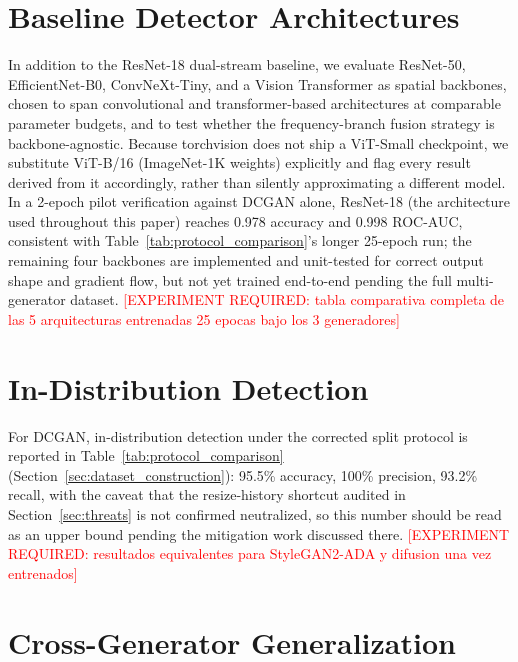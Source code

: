 \documentclass[journal]{IEEEtran}
\newcommand{\pending}[1]{\textcolor{red}{[EXPERIMENT REQUIRED: #1]}}
\begin{document}
\section{Baseline Detector Architectures}
\label{sec:baselines}

In addition to the ResNet-18 dual-stream baseline, we evaluate ResNet-50, EfficientNet-B0, ConvNeXt-Tiny, and a Vision Transformer as spatial backbones, chosen to span convolutional and transformer-based architectures at comparable parameter budgets, and to test whether the frequency-branch fusion strategy is backbone-agnostic. Because torchvision does not ship a ViT-Small checkpoint, we substitute ViT-B/16 (ImageNet-1K weights) explicitly and flag every result derived from it accordingly, rather than silently approximating a different model. In a 2-epoch pilot verification against DCGAN alone, ResNet-18 (the architecture used throughout this paper) reaches 0.978 accuracy and 0.998 ROC-AUC, consistent with Table~\ref{tab:protocol_comparison}'s longer 25-epoch run; the remaining four backbones are implemented and unit-tested for correct output shape and gradient flow, but not yet trained end-to-end pending the full multi-generator dataset. \pending{tabla comparativa completa de las 5 arquitecturas entrenadas 25 epocas bajo los 3 generadores}

\section{In-Distribution Detection}
\label{sec:in_distribution}

For DCGAN, in-distribution detection under the corrected split protocol is reported in Table~\ref{tab:protocol_comparison} (Section~\ref{sec:dataset_construction}): 95.5\% accuracy, 100\% precision, 93.2\% recall, with the caveat that the resize-history shortcut audited in Section~\ref{sec:threats} is not confirmed neutralized, so this number should be read as an upper bound pending the mitigation work discussed there. \pending{resultados equivalentes para StyleGAN2-ADA y difusion una vez entrenados}

\section{Cross-Generator Generalization}
\label{sec:cross_generator}
\end{document}
